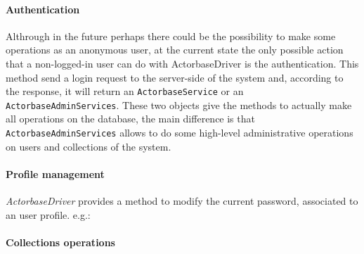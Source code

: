 \documentclass{scalatekids-article}
\begin{document}
\paragraph{Authentication}

Althrough in the future perhaps there could be the possibility to make some
operations as an anonymous user, at the current state the only possible action
that a non-logged-in user can do with ActorbaseDriver is the authentication.
This method send a login request to the server-side of the system and, according
to the response, it will return an \verb=ActorbaseService= or an
\verb=ActorbaseAdminServices=. These two objects give the methods to actually
make all operations on the database, the main difference is that
\verb=ActorbaseAdminServices= allows to do some high-level administrative
operations on users and collections of the system.

\paragraph{Profile management}

\textit{ActorbaseDriver} provides a method to modify the current password,
associated to an user profile.
e.g.:

\paragraph{Collections operations}
\end{document}
